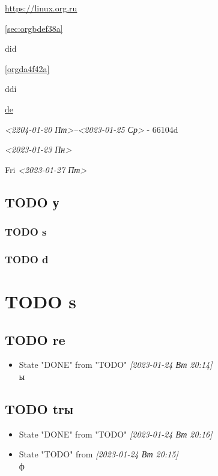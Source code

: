 \documentclass[11pt]{article}
\begin{document}
\url{https://linux.org.ru}

\ref{sec:orgbdef38a}

\label{orgda4f42a}
\label{org193ee75}did

\ref{orgda4f42a}

ddi

\href{https://linux.org.ru}{de}

\textit{<2204-01-20 Пт>--<2023-01-25 Ср> } - 66104d


\textit{<2023-01-23 Пн>}

Fri
\textit{<2023-01-27 Пт>}

\subsection{{\bfseries\sffamily TODO} у}
\label{sec:org3940b67}
\subsubsection{{\bfseries\sffamily TODO} s}
\label{sec:org9c013c6}
\subsubsection{{\bfseries\sffamily TODO} d}
\label{sec:org7dee919}

\section{{\bfseries\sffamily TODO} s}
\label{sec:orgca4a469}
\subsection{{\bfseries\sffamily TODO} re}
\label{sec:orgb16672b}
\begin{itemize}
\item State "DONE"       from "TODO"       \textit{[2023-01-24 Вт 20:14] } \\
ы
\end{itemize}
\subsection{{\bfseries\sffamily TODO} tr\hfill{}\textsc{ы}}
\label{sec:org6e514e4}
\begin{itemize}
\item State "DONE"       from "TODO"       \textit{[2023-01-24 Вт 20:16]}
\item State "TODO"       from              \textit{[2023-01-24 Вт 20:15] } \\
ф
\end{itemize}
\end{document}
